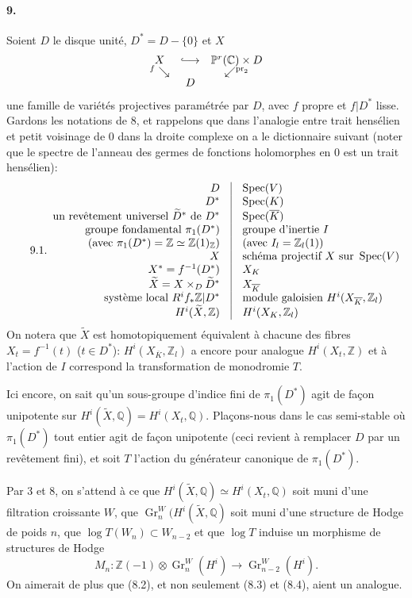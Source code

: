 \documentclass[10pt]{article}
\newcommand{\C}{\mathbb C}
\newcommand{\Q}{\mathbb Q}
\newcommand{\Z}{\mathbb Z}
\newcommand{\Gr}{\operatorname{Gr}}
\newcommand{\Spec}{\operatorname{Spec}}
\newcommand{\pr}{\operatorname{pr}}
\newcommand{\barK}{\overline{K}}
\newcommand{\wt}{\widetilde}
\begin{document}
\paragraph{9.} Soient $D$ le disque unité, $D^*=D-\{0\}$ et $X$
\[
\begin{array}{ccc}
X&\lhook\joinrel\longrightarrow&\mathbb P^r(\C)\times D\\[-0.2em]
{}^{f}\searrow&&\swarrow^{\pr_2}\\[-0.2em]
& D&
\end{array}
\]
une famille de variétés projectives paramétrée par $D$, avec $f$ propre et $f|D^*$ lisse. Gardons les notations de 8, et rappelons que dans l'analogie entre trait hensélien et petit voisinage de $0$ dans la droite complexe on a le dictionnaire suivant (noter que le spectre de l'anneau des germes de fonctions holomorphes en $0$ est un trait hensélien):
\[
\tag*{9.1.}
\begin{array}{r@{\quad\vrule\quad}l}
D & \Spec(V)\\
D^* & \Spec(K)\\
\text{un revêtement universel }\wt D^*\text{ de }D^* & \Spec(\barK)\\
\text{groupe fondamental }\pi_1(D^*) & \text{groupe d'inertie }I\\
\text{(avec }\pi_1(D^*)=\Z\simeq\Z(1)_\Z\text{)} & \text{(avec }I_l=\Z_l(1)\text{)}\\
X & \text{schéma projectif }X\text{ sur }\Spec(V)\\
X^*=f^{-1}(D^*) & X_K\\
\wt X=X\times_D\wt D^* & X_{\barK}\\
\text{système local }R^if_*\Z|D^* & \text{module galoisien }H^i(X_{\barK},\Z_l)\\
H^i(\wt X,\Z) & H^i(X_K,\Z_l) %
\end{array}
\]
On notera que $\wt X$ est homotopiquement équivalent à chacune des fibres $X_t=f^{-1}(t)$ ($t\in D^*$): $H^i(X_{\barK},\Z_l)$ a encore pour analogue $H^i(X_t,\Z)$ et à l'action de $I$ correspond la transformation de monodromie $T$.

Ici encore, on sait qu'un sous-groupe d'indice fini de $\pi_1(D^*)$ agit de façon unipotente sur $H^i(\wt X,\Q)=H^i(X_t,\Q)$. Plaçons-nous dans le cas semi-stable où $\pi_1(D^*)$ tout entier agit de façon unipotente (ceci revient à remplacer $D$ par un revêtement fini), et soit $T$ l'action du générateur canonique de $\pi_1(D^*)$.

Par 3 et 8, on s'attend à ce que $H^i(\wt X,\Q)\simeq H^i(X_t,\Q)$ soit muni d'une filtration croissante $W$, que $\Gr_n^W(H^i(\wt X,\Q)$ soit muni d'une structure de Hodge de poids $n$, que $\log T(W_n)\subset W_{n-2}$ et que $\log T$ induise un morphisme de structures de Hodge %
\[
M_n:\Z(-1)\otimes\Gr_n^W(H^i)\longrightarrow\Gr_{n-2}^W(H^i). %
\]
On aimerait de plus que (8.2), et non seulement (8.3) et (8.4), aient un analogue.
\end{document}
